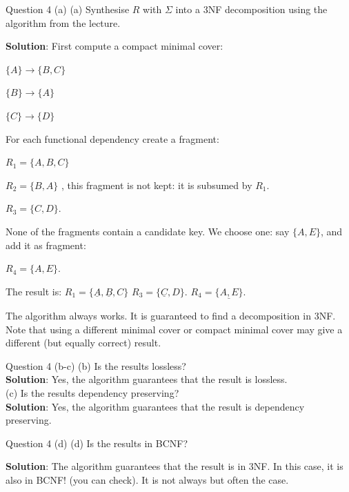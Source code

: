\begin{frame}[fragile]{Question 4 (a)}
(a) Synthesise $R$ with $\Sigma$ into a 3NF decomposition using the algorithm from the lecture.\\\vspace{5pt}

\textbf{Solution}:
First compute a compact minimal cover:

$\{A\} \rightarrow \{B, C\}$

$\{B\} \rightarrow \{A\}$

$\{C\} \rightarrow \{D\}$

For each functional dependency create a fragment:

$R_1 = \{A, B, C\}$

$R_2 = \{B, A\}$ , this fragment is not kept: it is subsumed by $R_1$.

$R_3 = \{C, D\}$.

None of the fragments contain a candidate key. We choose one: say $\{A, E\}$, and add it as fragment:

$R_4 = \{A, E\}$.

The result is:
$R_1 = \{\underline{A}, \underline{B}, C\}$
$R_3 = \{\underline{C}, D\}$.
$R_4 = \{\underline{A, E}\}$.

The algorithm always works. It is guaranteed to find a decomposition in 3NF. Note that using a different minimal cover or compact minimal cover may give a different (but equally correct) result.
\end{frame}

\begin{frame}[fragile]{Question 4 (b-c)}
(b) Is the results lossless?\\\vspace{5pt}
\textbf{Solution}: Yes, the algorithm guarantees that the result is lossless.
\\\vspace{30pt}
(c) Is the results dependency preserving?\\\vspace{5pt}
\textbf{Solution}:
Yes, the algorithm guarantees that the result is dependency preserving.

\end{frame}

\begin{frame}[fragile]{Question 4 (d)}
(d) Is the results in BCNF?\\\vspace{5pt}

\textbf{Solution}:
The algorithm guarantees that the result is in 3NF. In this case, it is also in BCNF! (you can check). It is not always but often the case.
\end{frame}

